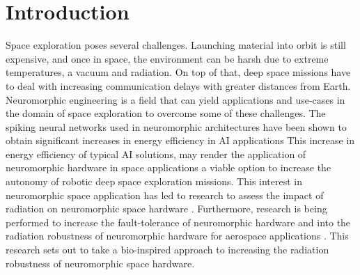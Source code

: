 \section{Introduction}\label{sec:introduction}
Space exploration poses several challenges. Launching material into orbit is still expensive, and once in space, the environment can be harsh due to extreme temperatures, a vacuum and radiation. On top of that, deep space missions have to deal with increasing communication delays with greater distances from Earth. Neuromorphic engineering is a field that can yield applications and use-cases in the domain of space exploration to overcome some of these challenges. The spiking neural networks used in neuromorphic architectures have been shown to obtain significant increases in energy efficiency in AI applications \cite{}\cite{}%
This increase in energy efficiency of typical AI solutions, may render the application of neuromorphic hardware in space applications a viable option to increase the autonomy of robotic deep space exploration missions. 
This interest in neuromorphic space application has led to research to assess the impact of radiation on neuromorphic space hardware \cite{cantley_impact_2021,roffe_neutron-induced_2021}. Furthermore, research is being performed to increase the fault-tolerance of neuromorphic hardware \cite{tran_design_2011} and into the radiation robustness of neuromorphic hardware for aerospace applications \cite{vaz_cmos_2020}. This research sets out to take a bio-inspired approach to increasing the radiation robustness of neuromorphic space hardware.

